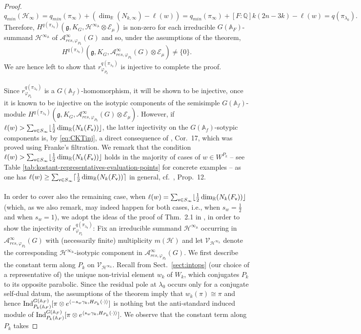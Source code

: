 \documentclass[a4paper,10pt]{amsart}
\theoremstyle{definition}
\numberwithin{equation}{section}
\def\R{\mathbb R}
\def\A{\mathbb A}
\def\Q{\mathbb Q}
\def\EE{\mathcal E}
\def\g{\mathfrak g}
\def\vv{{\sf v}} %
\begin{document}
\begin{proof}
\begin{equation}\label{eq:CKTinj}
q_{min}(\mathcal H_\infty)=q_{min}(\pi_\infty) + (\dim_{\R}(N_{k,\infty})-\ell(w))=q_{min}(\pi_\infty) + [F:\Q] k(2n-3k) -\ell(w)=q(\pi_{\lambda_0}).
\end{equation}
Therefore, $H^{q(\pi_{\lambda_0})}(\g,K_G, \mathcal H^{\infty_\A}\otimes \EE_\mu)$ is non-zero for each irreducible $G(\A_F)$-summand $ \mathcal H^{\infty_\A}$ of $\mathcal A^\infty_{res,\varphi_{P_k}}(G)$ and so, under the assumptions of the theorem,
$$H^{q(\pi_{\lambda_0})}(\g,K_G, \mathcal A^\infty_{res,\varphi_{P_k}}(G)\otimes\EE_\mu)\neq \{0\}.$$ 
We are hence left to show that $r^{q(\pi_{\lambda_0})}_{\varphi_{P_k}}$ is injective to complete the proof.\\\\ 
Since $r^{q(\pi_{\lambda_0})}_{\varphi_{P_k}}$ is a $G(\A_f)$-homomorphism, it will be shown to be injective, once it is known to be injective on the isotypic components of the semisimple $G(\A_f)$-module $H^{q(\pi_{\lambda_0})}(\g,K_G, \mathcal A^\infty_{res,\varphi_{P_k}}(G)\otimes\EE_\mu)$. However, if $\ell(w)>\sum_{\vv\in S_\infty}\lfloor\tfrac12 \dim_{\R}(N_{k}(F_\vv))\rfloor$, the latter injectivity on the $G(\A_f)$-sotypic components is, by \eqref{eq:CKTinj}, a direct consequence of \cite{grobner-EisRes}, Cor.\ 17, which was proved using Franke's filtration. We remark that the condition $\ell(w)>\sum_{\vv\in S_\infty}\lfloor\tfrac12 \dim_{\R}(N_{k}(F_\vv))\rfloor$ holds in the majority of cases of $w\in W^{P_k}$ -- see Table \ref{tab:kostant-representatives-evaluation-points} for concrete examples -- as one has $\ell(w)\geq \sum_{\vv\in S_\infty}\lceil\tfrac12 \dim_{\R}(N_{k}(F_\vv))\rceil$ in general, cf.\ \cite{grobner-EisRes}, Prop.\ 12.\\\\ 
In order to cover also the remaining case, when $\ell(w)=\sum_{\vv\in S_\infty}\lfloor\tfrac12 \dim_{\R}(N_{k}(F_\vv))\rfloor $ (which, as we also remark, may indeed happen for both cases, i.e., when $s_w=\tfrac12$ and when $s_w=1$), we adopt the ideas of the proof of Thm.\ 2.1 in \cite{grob22}, in order to show the injectivity of  $r^{q(\pi_{\lambda_0})}_{\varphi_{P_k}}$: Fix an irreducible summand $\mathcal H^{\infty_\A}$ occurring in $\mathcal A^\infty_{res,\varphi_{P_k}}(G)$ with (necessarily finite) multiplicity $m(\mathcal H)$ and let $\mathcal V_{\mathcal H^{\infty_\A}}$ denote the corresponding $\mathcal H^{\infty_\A}$-isotypic component in $\mathcal A^\infty_{res,\varphi_{P_k}}(G)$. We first describe the constant term along $P_k$ on $\mathcal V_{\mathcal H^{\infty_\A}}$. Recall from Sect.\ \ref{sect:intops} (our choice of a representative of) the unique non-trivial element $w_k$ of $W_k$, which conjugates $P_k$ to its opposite parabolic. Since the residual pole at \(\lambda_0\) occurs only for a conjugate self-dual datum, the assumptions of the theorem imply that ${w_k}(\pi)\cong\pi$ and hence ${\rm Ind}_{P_k(\A_F)}^{G(\A_F)}[\pi\otimes e^{\langle -s_w\gamma_k,H_{P_k}(\cdot)\rangle}]$ is nothing but the anti-standard induced module of ${\rm Ind}_{P_k(\A_F)}^{G(\A_F)}[\pi\otimes e^{\langle s_w\gamma_k,H_{P_k}(\cdot)\rangle}]$. We observe that the constant term along $P_k$ takes

\end{proof}
\end{document}
